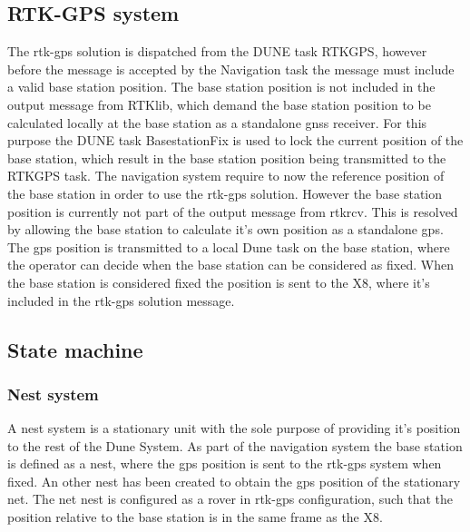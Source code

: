 \subsection{RTK-GPS system}\label{ss:RTK-GPS system}
The \gls{rtk-gps} solution is dispatched from the DUNE task RTKGPS, however before the message is accepted by the Navigation task the message must include a valid base station position. The base station position is not included in the output message from RTKlib, which demand the base station position to be calculated locally at the base station as a standalone \gls{gnss} receiver. For this purpose the DUNE task BasestationFix is used to lock the current position of the base station, which result in the base station position being transmitted to the RTKGPS task.
The navigation system require to now the reference position of the base station in order to use the \gls{rtk-gps} solution. However the base station position is currently not part of the output message from rtkrcv. This is resolved by allowing the base station to calculate it's own position as a standalone \gls{gps}. The \gls{gps} position is transmitted to a local Dune task on the base station, where the operator can decide when the base station can be considered as fixed. When the base station is considered fixed the position is sent to the X8, where it's included in the \gls{rtk-gps} solution message.
\subsection{State machine}
\subsubsection{Nest system}
A nest system is a stationary unit with the sole purpose of providing it's position to the rest of the Dune System. As part of the navigation system the base station is defined as a nest, where the \gls{gps} position is sent to the \gls{rtk-gps} system when fixed.
An other nest has been created to obtain the \gls{gps} position of the stationary net. The net nest is configured as a rover in \gls{rtk-gps} configuration, such that the position relative to the base station is in the same frame as the X8.
